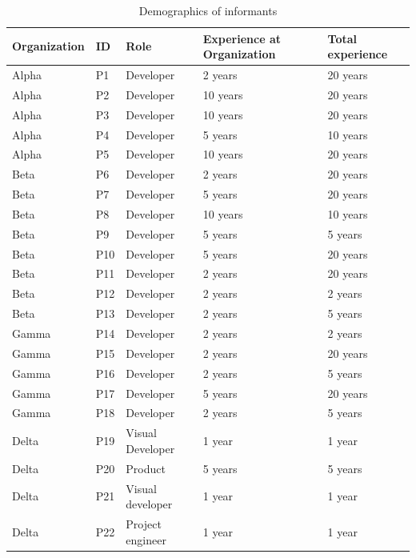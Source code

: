 \documentclass[smallextended]{svjour3}        %
\begin{document}
\begin{table}[!h]
\footnotesize
    \centering
    \caption{Demographics of informants}
    \label{tab:informants}
    \begin{tabular}{p{1.5cm}p{0.6cm}p{2.5cm}p{3.5cm}p{2cm}}
\toprule
Organization & ID & Role & Experience at Organization & Total experience\\
\midrule 
Alpha & P1 & Developer & 2 years & 20 years\\
Alpha & P2 & Developer & 10 years & 20 years\\
Alpha & P3 & Developer & 10 years & 20 years\\
Alpha & P4 & Developer & 5 years & 10 years\\
Alpha & P5 & Developer & 10 years & 20 years\\
Beta & P6 & Developer & 2 years & 20 years\\
Beta  & P7 & Developer & 5 years & 20 years\\
Beta  & P8 & Developer & 10 years & 10 years\\
Beta & P9 & Developer & 5 years & 5 years\\
Beta & P10 & Developer & 5 years & 20 years\\
Beta & P11 & Developer & 2 years & 20 years\\
Beta & P12 & Developer & 2 years & 2 years\\
Beta & P13 & Developer & 2 years & 5 years\\
Gamma & P14 & Developer & 2 years & 2 years\\
Gamma & P15 & Developer & 2 years & 20 years\\
Gamma & P16 & Developer & 2 years & 5 years\\
Gamma & P17 & Developer & 5 years & 20 years\\
Gamma & P18 & Developer & 2 years & 5 years\\
Delta & P19 & Visual Developer & 1 year & 1 year\\
Delta & P20 & Product  & 5 years & 5 years\\
Delta & P21 & Visual developer & 1 year & 1 year\\
Delta & P22 & Project engineer & 1 year & 1 year\\

\end{tabular}
\end{table}
\end{document}
